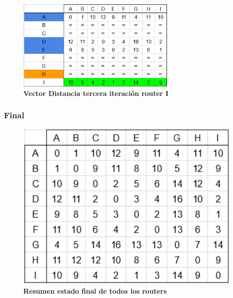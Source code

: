 \documentclass[12pt]{article}
\begin{document}
\begin{figure}[H] 
\centering 
\includegraphics[width=0.7\textwidth]{imagenes/3I3.png} \caption{\small \textbf{Vector Distancia tercera iteración router I}}
\label{fig:diagrama_81} 
\end{figure}

\newpage

\subsubsection{Final}

\begin{figure}[H] 
\centering 
\includegraphics[width=1\textwidth]{imagenes/3final.png} \caption{\small \textbf{Resumen estado final de todos los routers}}
\label{fig:diagrama_82} 
\end{figure}
\end{document}
